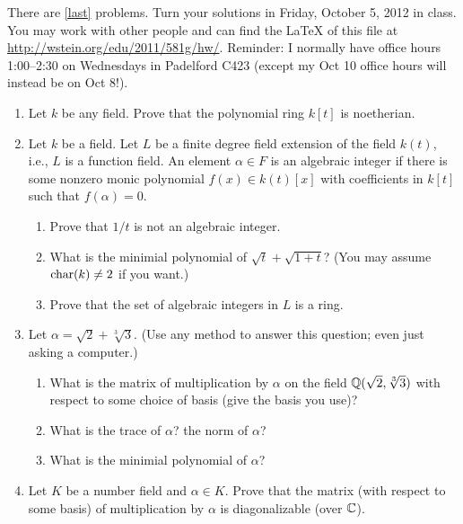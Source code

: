 \documentclass{article}
\title{\dred{Math 581e, Fall 2012, Homework 2}}
\author{William Stein ({\tt wstein@uw.edu})}
\date{Due: Friday, October 12, 2012}
\begin{document}
\maketitle

{\color{dbluecolor}There are \ref{last} problems. Turn your solutions in Friday, October
5, 2012 in class.  You may work with other people and can find the
\LaTeX{} of this file at \url{http://wstein.org/edu/2011/581g/hw/}.
Reminder: I normally have office hours 1:00--2:30 on Wednesdays in Padelford
C423 (except my Oct 10 office hours will instead be on Oct 8!).}

\begin{enumerate}

\item  Let $k$ be any field.  Prove that the polynomial ring $k[t]$ is noetherian.  
\item Let $k$ be a field.  Let $L$ be a finite degree field extension
  of the field $k(t)$, i.e., $L$ is a function field.  An element
  $\alpha \in F$ is an algebraic integer if there is some nonzero monic
  polynomial $f(x) \in k(t)[x]$ with coefficients in $k[t]$ such that
  $f(\alpha)=0$.
\begin{enumerate}
 \item  Prove that $1/t$ is not an algebraic integer.
 \item What is the minimial polynomial of $\sqrt{t} + \sqrt{1+t}$?  (You may assume $\operatorname{char}(k)\neq 2$ if you want.)
 \item Prove that the set of algebraic integers in $L$ is a ring. 
\end{enumerate}
\item Let $\alpha = \sqrt{2} + \sqrt[3]{3}$.     (Use any method to answer this question; even just asking a computer.)
\begin{enumerate}
\item What is the matrix of multiplication by $\alpha$ on the field $\mathbb{Q}(\sqrt{2}, \sqrt[3]{3})$ 
with respect to some choice of basis (give the basis you use)?
\item What is the trace of $\alpha$? the norm of $\alpha$?
\item What is the minimial polynomial of $\alpha$?  
\end{enumerate}

\item\label{last} Let $K$ be a number field and $\alpha \in K$.  Prove
  that the matrix (with respect to some basis) of multiplication by
  $\alpha$ is diagonalizable (over $\mathbb{C}$).


\end{enumerate}
\end{document}
